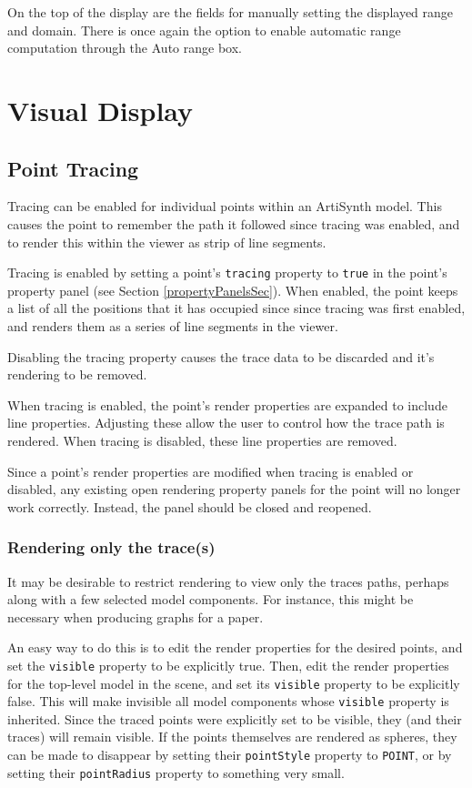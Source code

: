 \documentclass{article}
\begin{document}

On the top of the display are the fields for manually setting the displayed
range and domain.  There is once again the option to enable automatic
range computation through the {\sf Auto range} box.

\section{Visual Display}

\subsection{Point Tracing}

Tracing can be enabled for individual points within an ArtiSynth
model. This causes the point to remember the path it followed since
tracing was enabled, and to render this within the viewer as strip of
line segments.

Tracing is enabled by setting a point's {\tt tracing} property to 
{\tt true} in the point's property panel (see Section \ref{propertyPanelsSec}).
When enabled, the point keeps a list of all the positions that it has
occupied since since tracing was first enabled, and renders them as a
series of line segments in the viewer.

Disabling the tracing property causes the trace data to be discarded
and it's rendering to be removed.

When tracing is enabled, the point's render properties are expanded to
include line properties. Adjusting these allow the user to control how
the trace path is rendered. When tracing is disabled, these line
properties are removed.

Since a point's render properties are modified when tracing is enabled
or disabled, any existing open rendering property panels for the
point will no longer work correctly. Instead, the panel should be
closed and reopened.

\subsubsection{Rendering only the trace(s)}

It may be desirable to restrict rendering to view only the traces
paths, perhaps along with a few selected model components. For
instance, this might be necessary when producing graphs for a paper.

An easy way to do this is to edit the render properties for the
desired points, and set the {\tt visible} property to be explicitly
true. Then, edit the render properties for the top-level model in the
scene, and set its {\tt visible} property to be explicitly false.
This will make invisible all model components whose {\tt visible}
property is inherited. Since the traced points were explicitly set to
be visible, they (and their traces) will remain visible. If the points
themselves are rendered as spheres, they can be made to disappear by
setting their {\tt pointStyle} property to {\tt POINT}, or by setting
their {\tt pointRadius} property to something very small.
\end{document}
